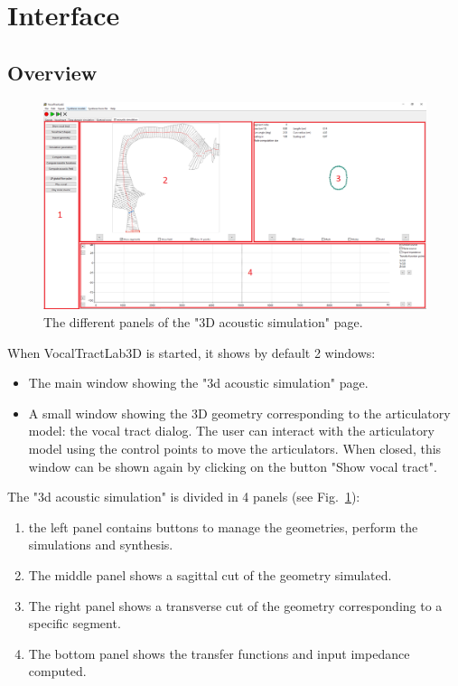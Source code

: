 \documentclass[]{article}
\begin{document}
	\section{Interface}
	
	\subsection{Overview}
	
	\begin{figure}[h!]
		\centering
		\includegraphics[scale=0.35]{acoustic_3d_simu_page.png}
		\caption{The different panels of the "3D acoustic simulation" page.}
		\label{figure:acoustic_3d_simu_page}
	\end{figure}
	
	When VocalTractLab3D is started, it shows by default 2 windows:
	\begin{itemize}
		\item The main window showing the "3d acoustic simulation" page.
		\item A small window showing the 3D geometry corresponding to the articulatory model: the vocal tract dialog. The user can interact with the articulatory model using the control points to move the articulators. When closed, this window can be shown again by clicking on the button "Show vocal tract".
	\end{itemize}

	The "3d acoustic simulation" is divided in 4 panels (see Fig.~\ref{figure:acoustic_3d_simu_page}):
	\begin{enumerate}
		\item the left panel contains buttons to manage the geometries, perform the simulations and synthesis.
		\item The middle panel shows a sagittal cut of the geometry simulated.
		\item The right panel shows a transverse cut of the geometry corresponding to a specific segment.
		\item The bottom panel shows the transfer functions and 
		input impedance computed. 
	\end{enumerate}
\end{document}

